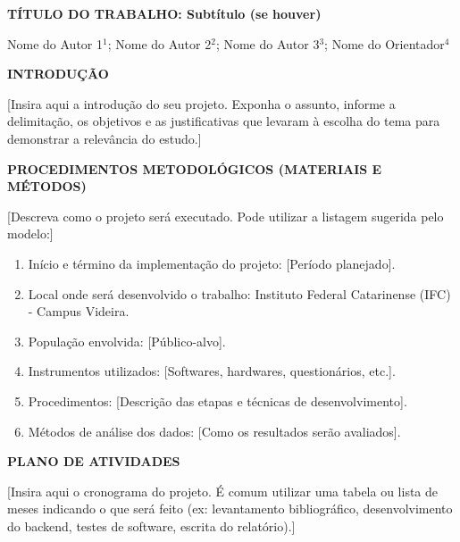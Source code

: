 \documentclass[12pt, a4paper]{article}
\newcommand{\titlesection}[1]{
    \vspace{1.5em}
    \noindent\textbf{\MakeUppercase{#1}}
    \vspace{1em}\par
}
\begin{document}
\onehalfspacing

\begin{center}
    \textbf{TÍTULO DO TRABALHO: Subtítulo (se houver)}
    
    \vspace{1.5em}
    Nome do Autor 1$^{1}$; Nome do Autor 2$^{2}$; Nome do Autor 3$^{3}$; Nome do Orientador$^{4}$
\end{center}


\titlesection{INTRODUÇÃO}
[Insira aqui a introdução do seu projeto. Exponha o assunto, informe a delimitação, os objetivos e as justificativas que levaram à escolha do tema para demonstrar a relevância do estudo.]

\titlesection{PROCEDIMENTOS METODOLÓGICOS (materiais e métodos)}

[Descreva como o projeto será executado. Pode utilizar a listagem sugerida pelo modelo:]

\begin{enumerate}[label=\alph*)]
    \item Início e término da implementação do projeto: [Período planejado].
    \item Local onde será desenvolvido o trabalho: Instituto Federal Catarinense (IFC) - Campus Videira.
    \item População envolvida: [Público-alvo].
    \item Instrumentos utilizados: [Softwares, hardwares, questionários, etc.].
    \item Procedimentos: [Descrição das etapas e técnicas de desenvolvimento].
    \item Métodos de análise dos dados: [Como os resultados serão avaliados].
\end{enumerate}

\titlesection{PLANO DE ATIVIDADES}
[Insira aqui o cronograma do projeto. É comum utilizar uma tabela ou lista de meses indicando o que será feito (ex: levantamento bibliográfico, desenvolvimento do backend, testes de software, escrita do relatório).]
\end{document}
